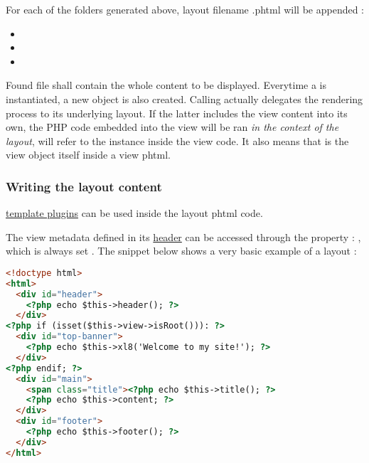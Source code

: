 \documentclass[pdftex,12pt,a4paper]{article}
\begin{document}
For each of the folders generated above, layout filename .phtml will be appended :
\begin{itemize}
	\item {}
	\item {}
	\item {}
\end{itemize}

Found file shall contain the whole content to be displayed. Everytime a  is instantiated, a new  object is also created. Calling  actually delegates the rendering process to its underlying layout. If the latter includes the view content into its own, the PHP code embedded into the view will be ran \emph{in the context of the layout}, \ie {} will refer to the  instance inside the view code. It also means that  is the view object itself inside a view phtml.

\subsubsection{Writing the layout content} \label{sec:writing-the-layout-content}

 \hyperref[sec:template-filters-and-plugins]{template plugins} can be used inside the layout phtml code.

The view metadata defined in its \hyperref[sec:view-header]{header} can be accessed through the  property : , which is always set . The snippet below shows a very basic example of a layout :
\begin{lstlisting}[label=layout-sample,caption=Simple layout sample,language=HTML]
<!doctype html>
<html>
  <div id="header">
    <?php echo $this->header(); ?>
  </div>
<?php if (isset($this->view->isRoot())): ?>
  <div id="top-banner">
    <?php echo $this->xl8('Welcome to my site!'); ?>
  </div>
<?php endif; ?>
  <div id="main">
    <span class="title"><?php echo $this->title(); ?>
    <?php echo $this->content; ?>
  </div>
  <div id="footer">
    <?php echo $this->footer(); ?>
  </div>
</html>
\end{lstlisting}
\end{document}
